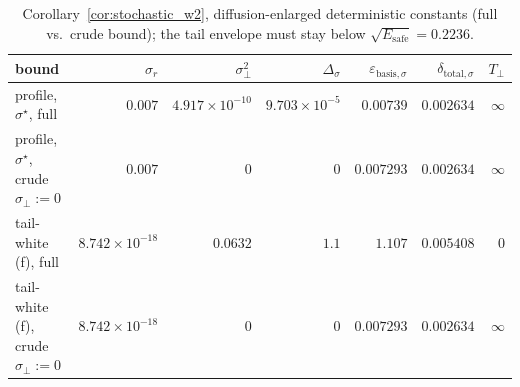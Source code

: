 \begin{table}[t]
\centering
\caption{Corollary~\ref{cor:stochastic_w2}, diffusion-enlarged deterministic constants (full vs.\ crude bound); the tail envelope must stay below $\sqrt{E_{\mathrm{safe}}}=0.2236$.}
\label{tab:exp7_corollary_det}
\footnotesize
\setlength{\tabcolsep}{4pt}
\begin{tabular}{lrrrrrr}
\toprule
bound & $\sigma_r$ & $\sigma_\perp^2$ & $\Delta_\sigma$ & $\varepsilon_{\mathrm{basis},\sigma}$ & $\delta_{\mathrm{total},\sigma}$ & $T_\perp$ \\
\midrule
profile, $\sigma^\star$, full & $0.007$ & $4.917\times10^{-10}$ & $9.703\times10^{-5}$ & $0.00739$ & $0.002634$ & $\infty$ \\
profile, $\sigma^\star$, crude $\sigma_\perp:=0$ & $0.007$ & $0$ & $0$ & $0.007293$ & $0.002634$ & $\infty$ \\
tail-white (f), full & $8.742\times10^{-18}$ & $0.0632$ & $1.1$ & $1.107$ & $0.005408$ & $0$ \\
tail-white (f), crude $\sigma_\perp:=0$ & $8.742\times10^{-18}$ & $0$ & $0$ & $0.007293$ & $0.002634$ & $\infty$ \\
\bottomrule
\end{tabular}
\end{table}
